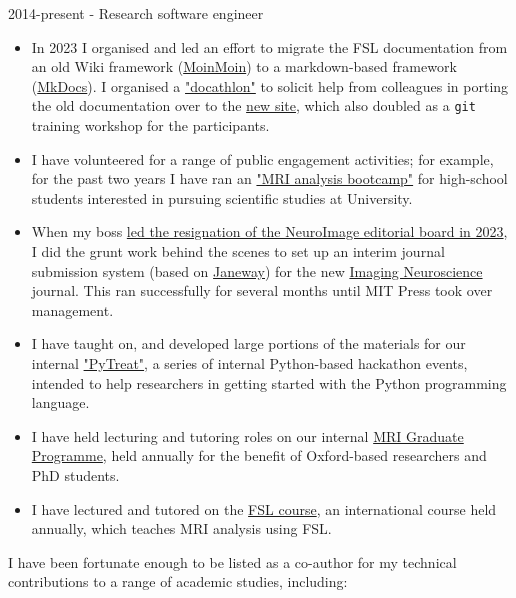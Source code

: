 \documentclass{resume}
\begin{document}
\begin{category}{2014-present - Research software engineer}
\begin{itemize}
\item In 2023 I organised and led an effort to migrate the FSL documentation
from an old Wiki framework (\href{https://github.com/moinwiki}{MoinMoin}) to a
markdown-based framework (\href{https://www.mkdocs.org/}{MkDocs}). I organised
a \href{https://git.fmrib.ox.ac.uk/paulmc/fsl-docathlon-2023/}{"docathlon"} to solicit help from colleagues
in porting the old documentation over to the \href{https://fsl.fmrib.ox.ac.uk/fsl/docs/}{new site}, which also doubled as a \texttt{git} training workshop for the
participants.
\item I have volunteered for a range of public engagement activities; for
example, for the past two years I have ran an \href{https://pages.fmrib.ox.ac.uk/paulmc/oxford_neuroscience_experience/}{"MRI analysis bootcamp"} for high-school students interested in
pursuing scientific studies at University.
\item When my boss \href{https://www.nature.com/articles/d41586-023-01391-5}{led the resignation of the NeuroImage
editorial board in 2023}, I did the grunt work behind the scenes to
set up an interim journal submission system (based on \href{https://github.com/BirkbeckCTP/janeway/}{Janeway}) for the new \href{https://direct.mit.edu/imag}{Imaging Neuroscience}
journal. This ran successfully for several months until MIT Press took
over management.
\item I have taught on, and developed large portions of the materials for our
internal \href{https://git.fmrib.ox.ac.uk/fsl/win-pytreat}{"PyTreat"}, a series of internal
Python-based hackathon events, intended to help researchers in getting
started with the Python programming language.
\item I have held lecturing and tutoring roles on our internal \href{https://www.ndcn.ox.ac.uk/study-with-us/graduate-students/fmrib-graduate-programme}{MRI Graduate Programme}, held annually for the
benefit of Oxford-based researchers and PhD students.
\item I have lectured and tutored on the \href{https://fsl.fmrib.ox.ac.uk/fslcourse/}{FSL course}, an international course held annually, which teaches MRI analysis
using FSL.
\end{itemize}\leavevmode\newline

I have been fortunate enough to be listed as a co-author for my
technical contributions to a range of academic studies, including:\newline


\end{category}
\end{document}
